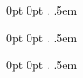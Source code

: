 

\usepackage{appendix}   %





{0pt}%
{0pt}%
{\setlength{\parskip}{.5\baselineskip}}%
{}%
{\bfseries\sffamily\color{black}}%
{.\;}%
{.5em}%
{}%

{0pt}%
{0pt}%
{\setlength{\parskip}{.5\baselineskip}}%
{}%
{\bfseries\sffamily\color{red!50!black}}%
{.\;}%
{.5em}%
{}%

{0pt}%
{0pt}%
{\setlength{\parskip}{.5\baselineskip}}%
{}%
{\bfseries\sffamily\color{green!50!black}}%
{.\;}%
{.5em}%
{}%

